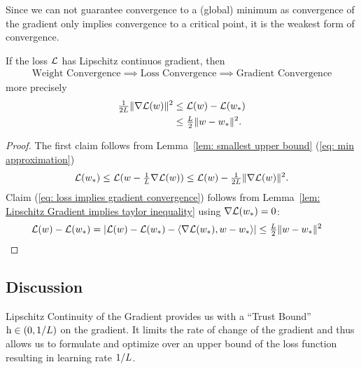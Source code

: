 Since we can not guarantee convergence to a (global) minimum as convergence of
the gradient only implies convergence to a critical point, it is the weakest
form of convergence.

\begin{theorem}\label{thm: convergence chain}
	If the loss \(\mathcal{L}\) has Lipschitz continuos gradient, then
	\begin{align*}
		\text{Weight Convergence}
		\implies \text{Loss Convergence}
		\implies \text{Gradient Convergence}
	\end{align*}
	more precisely
	\begin{align}
	\label{eq: weight implies loss convergence}
		\tfrac{1}{2L}\|\nabla\mathcal{L}(w)\|^2
		&\le \mathcal{L}(w) - \mathcal{L}(w_*)\\
	\label{eq: loss implies gradient convergence}
		&\le \tfrac{L}{2}\|w-w_*\|^2.
	\end{align}
\end{theorem}
\begin{proof}
	The first claim follows from Lemma~\ref{lem: smallest upper bound} (\ref{eq: min approximation})
	\begin{align*}
		\mathcal{L}(w_*) \le \mathcal{L}(w -\tfrac{1}{L}\nabla\mathcal{L}(w))
		\le \mathcal{L}(w) - \tfrac{1}{2L}\|\nabla\mathcal{L}(w)\|^2.
	\end{align*}
	Claim (\ref{eq: loss implies gradient convergence}) follows from Lemma~\ref{lem:
	Lipschitz Gradient implies taylor inequality} using
	\(\nabla\mathcal{L}(w_*)=0\):
	\begin{align*}
		\mathcal{L}(w) - \mathcal{L}(w_*)
		= |\mathcal{L}(w) - \mathcal{L}(w_*) - \langle \nabla\mathcal{L}(w_*), w-w_*\rangle|
		&\le \tfrac{L}{2}\|w-w_*\|^2
		\qedhere
	\end{align*}
\end{proof}

\subsection{Discussion}

Lipschitz Continuity of the Gradient provides us with a ``Trust Bound''
\(\text{h}\in(0,1/L)\) on the gradient. It limits the rate of change of the
gradient and thus allows us to
formulate and optimize over an upper bound of the loss function resulting in
learning rate \(1/L\).

